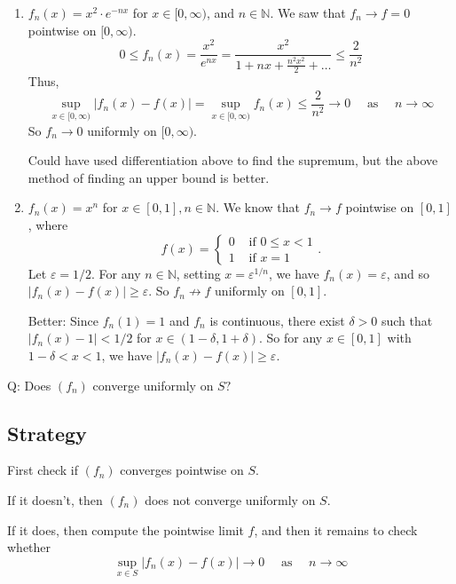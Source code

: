 \documentclass[a4paper,11pt]{article}
\begin{document}
\begin{example}
\begin{enumerate}
    \item $f_{n}(x)=x^{2} \cdot e^{-n x}$ for $x \in[0, \infty)$, and $n \in \mathbb{N}$. We saw that $f_{n} \rightarrow f=0$ pointwise on $[0, \infty)$.
    \[
    0 \leqslant f_{n}(x)=\frac{x^{2}}{e^{n x}}=\frac{x^{2}}{1+n x+\frac{n^{2} x^{2}}{2}+\ldots} \leqslant \frac{2}{n^2}
    \]
    Thus,
    \[
    \sup _{x \in[0, \infty)}\left|f_{n}(x)-f(x)\right|=\sup _{x \in[0, \infty)} f_{n}(x) \leqslant \frac{2}{n^{2}} \rightarrow 0 \quad \text { as } \quad n \rightarrow \infty
    \]
    So $f_{n} \rightarrow 0$ uniformly on $[0, \infty)$.

    Could have used differentiation above to find the supremum, but the above method of finding an upper bound is better.
    \item $f_{n}(x)=x^{n}$ for $x \in[0,1], n \in \mathbb{N}$.
    We know that $f_{n} \rightarrow f$ pointwise on $[0,1]$, where
    \[
        f(x)= \begin{cases}0 & \text { if } 0 \leqslant x<1 \\ 1 & \text { if } x=1\end{cases}.
    \]
    Let $\varepsilon=1 / 2$. For any $n \in \mathbb{N}$, setting $x=\varepsilon^{1 / n}$, we have $f_{n}(x)=\varepsilon$, and so $\left|f_{n}(x)-f(x)\right| \geqslant \varepsilon$. So $f_{n} \not \rightarrow  f$ uniformly on $[0,1]$.

    Better: Since $f_{n}(1)=1$ and $f_{n}$ is continuous, there exist $\delta>0$ such that $\left|f_{n}(x)-1\right|<1 / 2$ for $x \in(1-\delta, 1+\delta)$. So for any $x \in[0,1]$ with $1-\delta<x<1$, we have $\left|f_{n}(x)-f(x)\right| \geqslant \varepsilon$.
\end{enumerate}
\end{example}
Q: Does $\left(f_{n}\right)$ converge uniformly on $S ?$
\subsection*{Strategy}
First check if $\left(f_{n}\right)$ converges pointwise on $S$.

If it doesn't, then $\left(f_{n}\right)$ does not converge uniformly on $S$.

If it does, then compute the pointwise limit $f$, and then it remains to check whether
\[
\sup _{x \in S}\left|f_{n}(x)-f(x)\right| \rightarrow 0 \quad \text { as } \quad n \rightarrow \infty
\]
\end{document}

